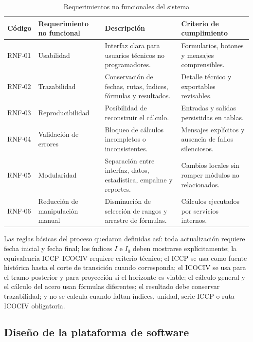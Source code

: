 \documentclass[12pt,letterpaper]{article}
\newcommand{\ICOCIV}{ICOCIV}
\newcommand{\ICCP}{ICCP}
\begin{document}
\begin{table}[H]
\centering
\caption{Requerimientos no funcionales del sistema}
\label{tab:req_no_funcionales}
\vspace{\baselineskip}
\scriptsize
\begin{adjustbox}{max width=\textwidth}
\begin{tabularx}{\textwidth}{@{}p{1.4cm}p{3.7cm}YY@{}}
\toprule
\textbf{Código} & \textbf{Requerimiento no funcional} & \textbf{Descripción} & \textbf{Criterio de cumplimiento} \\
\midrule
RNF-01 & Usabilidad & Interfaz clara para usuarios técnicos no programadores. & Formularios, botones y mensajes comprensibles. \\
RNF-02 & Trazabilidad & Conservación de fechas, rutas, índices, fórmulas y resultados. & Detalle técnico y exportables revisables. \\
RNF-03 & Reproducibilidad & Posibilidad de reconstruir el cálculo. & Entradas y salidas persistidas en tablas. \\
RNF-04 & Validación de errores & Bloqueo de cálculos incompletos o inconsistentes. & Mensajes explícitos y ausencia de fallos silenciosos. \\
RNF-05 & Modularidad & Separación entre interfaz, datos, estadística, empalme y reportes. & Cambios locales sin romper módulos no relacionados. \\
RNF-06 & Reducción de manipulación manual & Disminución de selección de rangos y arrastre de fórmulas. & Cálculos ejecutados por servicios internos. \\
\bottomrule
\end{tabularx}
\end{adjustbox}
\end{table}

Las reglas básicas del proceso quedaron definidas así: toda actualización requiere fecha inicial y fecha final; los índices \(I\) e \(I_0\) deben mostrarse explícitamente; la equivalencia \ICCP--\ICOCIV{} requiere criterio técnico; el \ICCP{} se usa como fuente histórica hasta el corte de transición cuando corresponda; el \ICOCIV{} se usa para el tramo posterior y para proyección si el horizonte es viable; el cálculo general y el cálculo del acero usan fórmulas diferentes; el resultado debe conservar trazabilidad; y no se calcula cuando faltan índices, unidad, serie \ICCP{} o ruta \ICOCIV{} obligatoria.

\subsection{Diseño de la plataforma de software}
\end{document}
